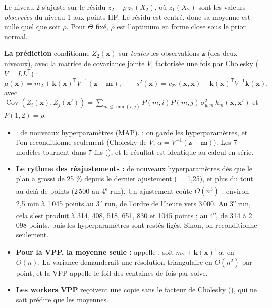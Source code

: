 \documentclass[10pt,a4paper]{article}
\newcommand{\vx}{\bm{x}}
\newcommand{\tp}{^{\mathsf{T}}}
\DeclareMathOperator{\Cov}{Cov}
\begin{document}
Le niveau 2 s'ajuste sur le résidu $z_2-\rho\,z_1(X_2)$, où $z_1(X_2)$ sont les valeurs \emph{observées} du
niveau 1 aux points HF. Le résidu est centré, donc sa moyenne est nulle quel que soit $\rho$. Pour $\Theta$
fixé, $\hat\rho$ est l'optimum en forme close sous le prior normal.

\textbf{La prédiction} conditionne $Z_2(\vx)$ sur \emph{toutes} les observations $\bm{z}$ (des deux
niveaux), avec la matrice de covariance jointe $V$, factorisée une fois par Cholesky ($V=LL\tp$) :
\[
  \mu(\vx)=m_2+\bm{k}(\vx)\tp V^{-1}(\bm{z}-\bm{m}),\qquad
  s^2(\vx)=c_{22}(\vx,\vx)-\bm{k}(\vx)\tp V^{-1}\bm{k}(\vx),
\]
avec $\Cov(Z_i(\vx),Z_j(\vx'))=\sum_{m\le\min(i,j)}P(m,i)P(m,j)\,\sigma_{y,m}^2\,k_m(\vx,\vx')$ et
$P(1,2)=\rho$.

\begin{danslecode}
\begin{itemize}
  \item {} : de nouveaux hyperparamètres (MAP).  : on garde les
        hyperparamètres, et l'on reconditionne seulement (Cholesky de $V$, $\alpha=V^{-1}(\bm z-\bm m)$).
        Les 7 modèles tournent dans 7 fils (), et le résultat est identique
        au calcul en série.
  \item \textbf{Le rythme des réajustements :} de nouveaux hyperparamètres dès que le plan a grossi de 25 \%
        depuis le dernier ajustement ( = 1,25), et plus du tout au-delà de
         points (2\,500 au 4\textsuperscript{e} run). Un ajustement coûte $O(n^3)$ :
        environ 2,5 min à 1\,045 points au 3\textsuperscript{e} run, de l'ordre de l'heure vers 3\,000. Au 3\textsuperscript{e} run, cela s'est produit à 314, 408, 518, 651, 830 et 1045 points ;
        au 4\textsuperscript{e}, de 314 à 2\,098 points, puis les hyperparamètres sont restés figés. Sinon, on
        reconditionne seulement.
  \item \textbf{Pour la VPP, la moyenne seule :}  appelle , soit
        $m_2+\bm{k}(\vx)\tp\alpha$, en $O(n)$. La variance demanderait une résolution triangulaire en
        $O(n^2)$ par point, et la VPP appelle le foil des centaines de fois par solve.
  \item \textbf{Les workers VPP} reçoivent une copie sans le facteur de Cholesky (), qui
        ne sait prédire que les moyennes.
\end{itemize}
\end{danslecode}
\end{document}
